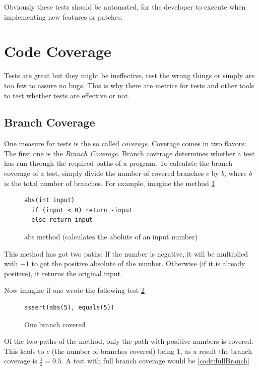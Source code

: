 Obviously these tests should be automated, for the developer to execute when
implementing new features or patches.

\section{Code Coverage}

Tests are great but they might be ineffective, test the wrong things
or simply are too few to assure no bugs. This is why there are metrics
for tests and other tools to test whether tests are effective or not.

\subsection{Branch Coverage}

One measure for tests is the so called \textit{coverage}. Coverage
comes in two flavors: The first one is the \textit{Branch Coverage}.
Branch coverage determines whether a test has run through the
required paths of a program. To calculate the branch coverage of a test,
simply divide the number of covered branches $c$ by $b$, where $b$ is the
total number of branches. For example, imagine the method \ref{code:branchCoverage}

\begin{figure}
\begin{lstlisting}
abs(int input)
  if (input < 0) return -input
  else return input
\end{lstlisting}
\caption{abs method (calculates the abolute of an input number)}
\label{code:branchCoverage}
\end{figure}

This method has got two paths: If the number is negative, it will
be multiplied with $-1$ to get the positive absolute of the number.
Otherwise (if it is already positive), it returns the original input.

Now imagine if one wrote the following test \ref{code:oneBranch}

\begin{figure}
\begin{lstlisting}
assert(abs(5), equals(5))
\end{lstlisting}
\caption{One branch covered}
\label{code:oneBranch}
\end{figure}

Of the two paths of the method, only the path with positive numbers is
covered. This leads to $c$ (the number of branches covered) being $1$,
as a result the branch coverage is $\frac{1}{2} = 0.5$. A test with
full branch coverage would be \ref{code:fullBranch}

